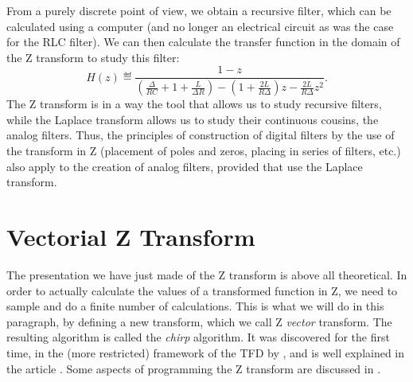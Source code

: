  
From a purely discrete point of view, we obtain a recursive filter, which can be calculated using a computer (and no longer an electrical circuit as was the case for the RLC filter). We can then calculate the transfer function in the domain of the Z transform to study this filter:
\begin{equation*}
H (z) \eqdef \frac{1 - z}{\left(\frac{\Delta}{RC} + 1 + \frac{L}{\Delta R} \right) - \left(1 + \frac{2 L}{R \Delta} \right) z - \frac{2 L}{R \Delta} z^2}.
\end{equation*}
The Z transform is in a way the tool that allows us to study recursive filters, while the Laplace transform allows us to study their continuous cousins, the analog filters. Thus, the principles of construction of digital filters by the use of the transform in Z (placement of poles and zeros, placing in series of filters, etc.) also apply to the creation of analog filters, provided that use the Laplace transform.
\section{Vectorial Z Transform}
\label{sect1-trans-Z-vector} 
 
 The presentation we have just made of the Z transform is above all theoretical. In order to actually calculate the values of a transformed function in Z, we need to sample and do a finite number of calculations. This is what we will do in this paragraph, by defining a new transform, which we call Z \textit{vector} transform. The resulting algorithm is called the \textit{chirp} algorithm. It was discovered for the first time, in the (more restricted) framework of the TFD by , and is well explained in the article \cite{swarztrauber-bluestein}. Some aspects of programming the Z transform are discussed in \cite{arndt-algo-programmers}.
